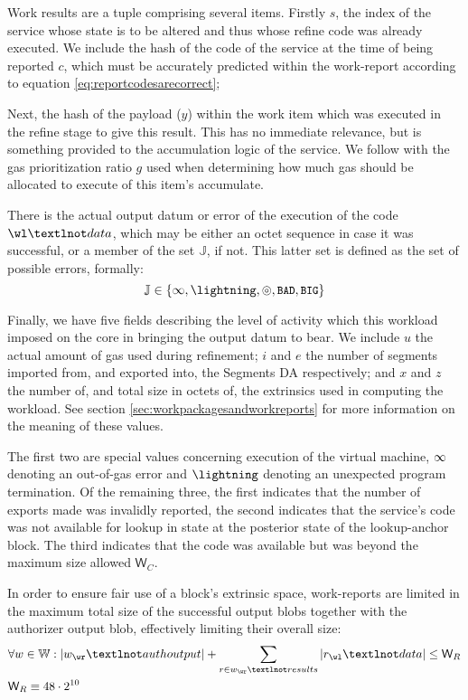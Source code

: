 Work results are a tuple comprising several items. Firstly $s$, the index of the service whose state is to be altered and thus whose refine code was already executed. We include the hash of the code of the service at the time of being reported $c$, which must be accurately predicted within the work-report according to equation \ref{eq:reportcodesarecorrect};

Next, the hash of the payload ($y$) within the work item which was executed in the refine stage to give this result. This has no immediate relevance, but is something provided to the accumulation logic of the service. We follow with the gas prioritization ratio $g$ used when determining how much gas should be allocated to execute of this item's accumulate.

There is the actual output datum or error of the execution of the code $\wl¬data$, which may be either an octet sequence in case it was successful, or a member of the set $\mathbb{J}$, if not. This latter set is defined as the set of possible errors, formally:
\begin{equation}
  \mathbb{J} \in \{ \oog, \panic, \badexports, \token{BAD}, \token{BIG} \}
\end{equation}

Finally, we have five fields describing the level of activity which this workload imposed on the core in bringing the output datum to bear. We include $u$ the actual amount of gas used during refinement; $i$ and $e$ the number of segments imported from, and exported into, the Segments DA respectively; and $x$ and $z$ the number of, and total size in octets of, the extrinsics used in computing the workload. See section \ref{sec:workpackagesandworkreports} for more information on the meaning of these values.

The first two are special values concerning execution of the virtual machine, $\infty$ denoting an out-of-gas error and $\panic$ denoting an unexpected program termination. Of the remaining three, the first indicates that the number of exports made was invalidly reported, the second indicates that the service's code was not available for lookup in state at the posterior state of the lookup-anchor block. The third indicates that the code was available but was beyond the maximum size allowed $\mathsf{W}_C$.

In order to ensure fair use of a block's extrinsic space, work-reports are limited in the maximum total size of the successful output blobs together with the authorizer output blob, effectively limiting their overall size:
\begin{align}
  &\forall w \in \mathbb{W}:
    |w_\wr¬authoutput| + \sum_{r \in w_\wr¬results} |r_\wl¬data| \le \mathsf{W}_R \\
  &\mathsf{W}_R \equiv 48\cdot2^{10}
\end{align}









